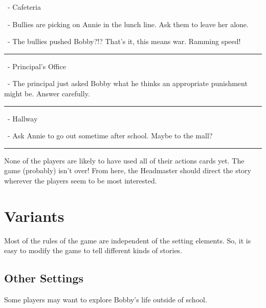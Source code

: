 \documentclass[a4paper, 10pt,notumble]{leaflet}
\DeclareRobustCommand\spades[1][black]{\textcolor{#1}{\cardfont{\}}}}
\DeclareRobustCommand\hearts[1][red]{\textcolor{#1}{{\cardfont{\{}}}}
\DeclareRobustCommand\diamonds[1][red]{\textcolor{#1}{{\cardfont{[}}}}
\DeclareRobustCommand\clubs[1][black]{\textcolor{#1}{\cardfont{]}}}
\DeclareRobustCommand\six[1][black]{\textcolor{#1}{\cardfont{6}}}
\DeclareRobustCommand\seven[1][black]{\textcolor{#1}{\cardfont{7}}}
\DeclareRobustCommand\redfive[1][red]{\textcolor{#1}{\cardfont{5}}}
\DeclareRobustCommand\redsix[1][red]{\textcolor{#1}{\cardfont{6}}}
\DeclareRobustCommand\redseven[1][red]{\textcolor{#1}{\cardfont{7}}}
\DeclareRobustCommand\redeight[1][red]{\textcolor{#1}{\cardfont{8}}}
\DeclareRobustCommand\redten[1][red]{\textcolor{#1}{\cardfont{=}}}
\begin{document}
\begin{description}[topsep=0pt, labelindent=0pt, leftmargin=0.0cm]
	
	\item[Location 4\normalfont{:}] \redfive\diamonds\ - Cafeteria
	\smallskip
	\begin{description}[labelindent = 0.5cm, leftmargin=0.75cm]
		\item[Challenge 4a\normalfont{:}] \redeight\hearts\ - Bullies are picking on Annie in the lunch line. Ask them to leave her alone.
		\item[Challenge 4b\normalfont{:}] \six\clubs\ - The bullies pushed Bobby?!? That's it, this means war. Ramming speed! 
	\end{description}
	
	\rule{\textwidth}{1pt}
	
	\item[Location 5\normalfont{:}] \redsix\diamonds\ - Principal's Office
	\smallskip
	\begin{description}[labelindent = 0.5cm, leftmargin=0.75cm]
		\item[Challenge 5a\normalfont{:}] \seven\spades\ - The principal just asked Bobby what he thinks an appropriate punishment might be. Answer carefully.
	\end{description}
	
	\rule{\textwidth}{1pt}
	
	\item[Location 6\normalfont{:}] \redseven\diamonds\ - Hallway
	\smallskip
	\begin{description}[labelindent = 0.5cm, leftmargin=0.75cm]
		\item[Challenge 6a\normalfont{:}] \redten\hearts\ - Ask Annie to go out sometime after school. Maybe to the mall?
	\end{description}
	
	\rule{\textwidth}{1pt}

\end{description}
\medskip
None of the players are likely to have used all of their actions cards yet. The game (probably) isn't over! From here, the Headmaster should direct the story wherever the players seem to be most interested.

\newpage
\section{Variants}
Most of the rules of the game are independent of the setting elements. So, it is easy to modify the game to tell different kinds of stories.

\subsection{Other Settings}
Some players may want to explore Bobby's life outside of school. 
\end{document}
